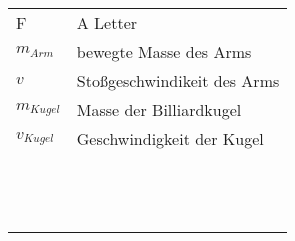     \begin{table}[h]
        \begin{tabular}{@{}ll@{}}%
            F & A Letter\\
            \(m_{Arm}\) & bewegte Masse des Arms\\
            \(v\) & Stoßgeschwindikeit des Arms\\
            \(m_{Kugel}\) & Masse der Billiardkugel\\
            \(v_{Kugel}\) & Geschwindigkeit der Kugel\\
            \({}\) & \\
            \({}\) & \\
            \({}\) & \\
            \({}\) & \\
            \({}\) & \\
            \({}\) & \\
            \({}\) & \\
            \({}\) & \\
            \({}\) & \\
            \({}\) & \\
            \({}\) & \\
            \({}\) & \\
            \({}\) & \\

    \end{tabular}\label{tab:glossar}
    \end{table}